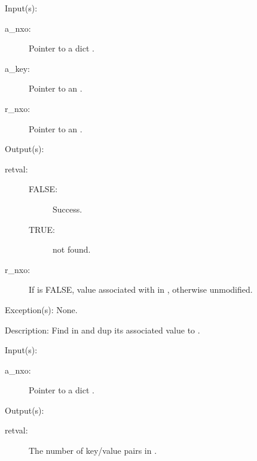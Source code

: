 \begin{capi}
\begin{capilist}
	\end{capilist}
\label{nxo_dict_lookup}
	\begin{capilist}
	\item[Input(s): ]
		\begin{description}\item[]
		\item[a\_nxo: ]
			Pointer to a dict .
		\item[a\_key: ]
			Pointer to an .
		\item[r\_nxo: ]
			Pointer to an .
		\end{description}
	\item[Output(s): ]
		\begin{description}\item[]
		\item[retval: ]
			\begin{description}\item[]
			\item[FALSE: ]
				Success.
			\item[TRUE: ]
				 not found.
			\end{description}
		\item[r\_nxo: ]
			If  is FALSE, value associated with
			 in , otherwise unmodified.
		\end{description}
	\item[Exception(s): ] None.
	\item[Description: ]
		Find  in  and dup its associated value
		to .
	\end{capilist}
\label{nxo_dict_count}
	\begin{capilist}
	\item[Input(s): ]
		\begin{description}\item[]
		\item[a\_nxo: ]
			Pointer to a dict \classname{nxo}.
		\end{description}
	\item[Output(s): ]
		\begin{description}\item[]
		\item[retval: ]
			The number of key/value pairs in \cvar{a\_nxo}.

\end{description}
\end{capilist}
\end{capi}
